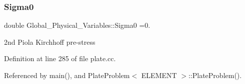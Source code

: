 \subsubsection{\texorpdfstring{Sigma0}{Sigma0}}
{\footnotesize\ttfamily double Global\+\_\+\+Physical\+\_\+\+Variables\+::\+Sigma0 =0.}



2nd Piola Kirchhoff pre-\/stress 



Definition at line 285 of file plate.\+cc.



Referenced by main(), and Plate\+Problem$<$ E\+L\+E\+M\+E\+N\+T $>$\+::\+Plate\+Problem().

